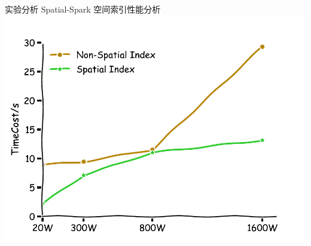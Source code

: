 \begin{frame}[t]{实验分析}
    Spatial-Spark 空间索引性能分析
    \vspace{1em}
    \includegraphics[width=0.9 \textwidth]{figures/index.pdf}
\end{frame}


